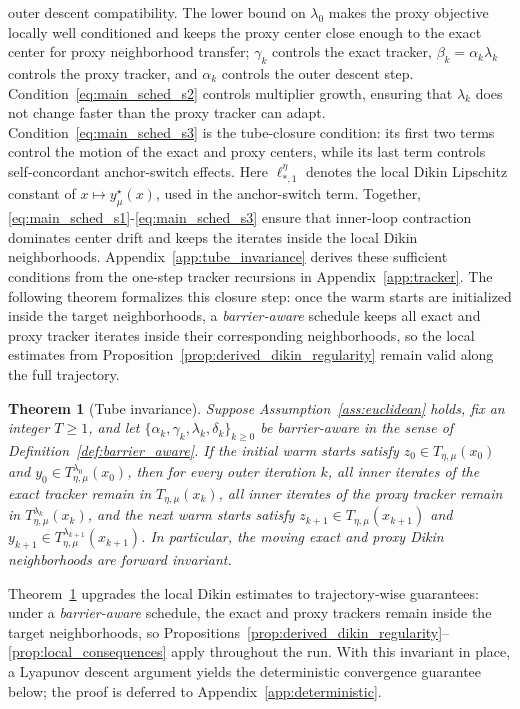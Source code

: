 \documentclass{article}
\newtheorem{theorem}{Theorem}
\begin{document}
outer descent compatibility. The lower bound on \(\lambda_0\) makes the proxy objective locally
well conditioned and keeps the proxy center close enough to the exact center for proxy neighborhood transfer;
\(\gamma_k\) controls the exact tracker, \(\beta_k=\alpha_k\lambda_k\) controls the proxy tracker, and
\(\alpha_k\) controls the outer descent step. Condition~\eqref{eq:main_sched_s2} controls multiplier
growth, ensuring that \(\lambda_k\) does not change faster than the proxy tracker can adapt.
Condition~\eqref{eq:main_sched_s3} is the tube-closure condition: its first two terms control the
motion of the exact and proxy centers, while its last term controls self-concordant anchor-switch
effects. Here \(\ell_{*,1}^{\eta}\) denotes the local Dikin Lipschitz constant of \(x\mapsto y_\mu^\star(x)\), used in the anchor-switch term. Together, \eqref{eq:main_sched_s1}-\eqref{eq:main_sched_s3} ensure that inner-loop contraction dominates center drift and
keeps the iterates inside the local Dikin neighborhoods. Appendix~\ref{app:tube_invariance} derives
these sufficient conditions from the one-step tracker recursions in Appendix~\ref{app:tracker}. The following theorem formalizes this closure step: once the warm starts are initialized inside the
target neighborhoods, a \textit{barrier-aware} schedule keeps all exact and proxy tracker iterates inside their
corresponding neighborhoods, so the local estimates from Proposition~\ref{prop:derived_dikin_regularity}
remain valid along the full trajectory.



\begin{theorem}[Tube invariance]
\label{thm:tube_invariance}
Suppose Assumption~\ref{ass:euclidean} holds, fix an integer \(T\ge 1\), and let
\(\{\alpha_k,\gamma_k,\lambda_k,\delta_k\}_{k\ge 0}\) be \textit{barrier-aware} in the sense of
Definition~\ref{def:barrier_aware}. If the initial warm starts satisfy
\(z_0\in T_{\eta,\mu}(x_0)\) and \(y_0\in T_{\eta,\mu}^{\lambda_0}(x_0)\),
then for every outer iteration \(k\), all inner iterates of the exact tracker remain in
\(T_{\eta,\mu}(x_k)\), all inner iterates of the proxy tracker remain in
\(T_{\eta,\mu}^{\lambda_k}(x_k)\), and the next warm starts satisfy
\(z_{k+1}\in T_{\eta,\mu}(x_{k+1})\) and \(y_{k+1}\in T_{\eta,\mu}^{\lambda_{k+1}}(x_{k+1})\).
In particular, the moving exact and proxy Dikin neighborhoods are forward invariant.
\end{theorem}

Theorem~\ref{thm:tube_invariance} upgrades the local Dikin estimates to trajectory-wise guarantees:
under a \textit{barrier-aware} schedule, the exact and proxy trackers remain inside the target neighborhoods, so
Propositions~\ref{prop:derived_dikin_regularity}--\ref{prop:local_consequences} apply throughout
the run. With this invariant in place, a Lyapunov descent argument yields the deterministic
convergence guarantee below; the proof is deferred to Appendix~\ref{app:deterministic}.
\end{document}
